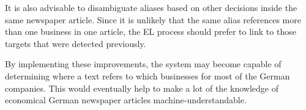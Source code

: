 It is also advisable to disambiguate aliases based on other decisions inside the same newspaper article. Since it is unlikely that the same alias references more than one business in one article, the EL process should prefer to link to those targets that were detected previously.

By implementing these improvements, the system may become capable of determining where a text refers to which businesses for most of the German companies. This would eventually help to make a lot of the knowledge of economical German newspaper articles machine-understandable.